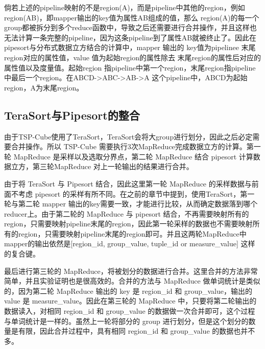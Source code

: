 倘若上述的pipeline映射的不是region(A)，而是pipeline中其他的region，例如region(AB)，即mapper输出的key值为属性AB组成的值，那么 region(A)的每一个group都被拆分到多个reduce函数中，导致之后还需要进行合并操作，并且这样也无法计算一条完整的pipeline，因为这条pipeline到了属性AB就被终止了。因此在pipesort与分布式数据立方结合的计算中，mapper 输出的 key值为pipelinee 末尾region对应的属性值，value 值为起始region的属性除去 末尾region的属性后对应的属性值以及度量值。起始region 指pipeline中第一个region，末尾region指pipeline中最后一个region。在ABCD-\textgreater ABC-\textgreater AB-\textgreater A 这个pipeline中，ABCD为起始region，A为末尾region。



\subsection{TeraSort与Pipesort的整合}

由于TSP-Cube使用了TeraSort，TeraSort会将大group进行划分，因此之后必定需要合并操作。所以 TSP-Cube 需要执行3次MapReduce完成数据立方的计算。第一轮 MapReduce 是采样以及选取分界点，第二轮 MapReduce 结合 pipesort 计算数据立方，第三轮MapReduce 对上一轮输出的结果进行合并。

由于将 TeraSort 与 Pipesort 结合，因此这里第一轮 MapReduce 的采样数据与前面不考虑 pipesort 的采样有所不同。在之前的章节中提到，使用TeraSort，第一轮与第二轮 mapper 输出的key需要一致，才能进行比较，从而确定数据落到哪个reducer上。由于第二轮的 MapReduce 与 pipesort 结合，不再需要映射所有的region，只需要映射pipeline末尾的region，因此第一轮采样的数据也不需要映射所有的region，只需要映射pipeline末尾的region即可。并且这两轮MapReduce中 mapper的输出依然是[region\_id, group\_value, tuple\_id or measure\_value] 这样的复合键。



最后进行第三轮的 MapReduce，将被划分的数据进行合并。这里合并的方法非常简单，并且实验证明也是很高效的。合并的方法与 MapReduce 做单词统计是类似的，因为第二轮 MapReduce 输出的 key 是 region\_id 和 group\_value，输出的 value 是 measure\_value。因此在第三轮的 MapReduce 中，只要将第二轮输出的数据读入，对相同 region\_id 和 group\_value 的数据做一次合并即可，这个过程与单词统计是一样的。虽然上一轮将部分的 group 进行划分，但是这个划分的数量是有限，因此合并过程中，具有相同 region\_id 和 group\_value 的数据也并不多。



